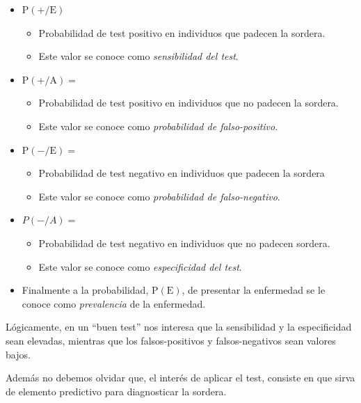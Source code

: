 \documentclass[
]{article}
\providecommand{\tightlist}{%
  \setlength{\itemsep}{0pt}\setlength{\parskip}{0pt}}
\begin{document}
\begin{itemize}
\item
  \(\mathrm{P}(+/ \mathrm{E})\)

  \begin{itemize}
  \tightlist
  \item
    Probabilidad de test positivo en individuos que padecen la sordera.
  \item
    Este valor se conoce como \emph{sensibilidad del test}.
  \end{itemize}
\item
  \(\mathrm{P}(+/ \mathrm{A})=\)

  \begin{itemize}
  \tightlist
  \item
    Probabilidad de test positivo en individuos que no padecen la sordera.
  \item
    Este valor se conoce como \emph{probabilidad de falso-positivo}.
  \end{itemize}
\item
  \(\mathrm{P}(-/ \mathrm{E})=\)

  \begin{itemize}
  \tightlist
  \item
    Probabilidad de test negativo en individuos que padecen la sordera
  \item
    Este valor se conoce como \emph{probabilidad de falso-negativo}.
  \end{itemize}
\item
  \(P(-/ A)=\)

  \begin{itemize}
  \tightlist
  \item
    Probabilidad de test negativo en individuos que no padecen sordera.
  \item
    Este valor se conoce como
    \emph{especificidad del test}.
  \end{itemize}
\item
  Finalmente a la probabilidad, \(\mathrm{P}(\mathrm{E})\), de presentar la enfermedad se le conoce como \emph{prevalencia} de la enfermedad.
\end{itemize}

Lógicamente, en un ``buen test'' nos interesa que la sensibilidad y la especificidad sean elevadas, mientras que los falsos-positivos y falsos-negativos sean valores bajos.

Además no debemos olvidar que, el interés de aplicar el test, consiste en que sirva de elemento predictivo para diagnosticar la sordera.
\end{document}
